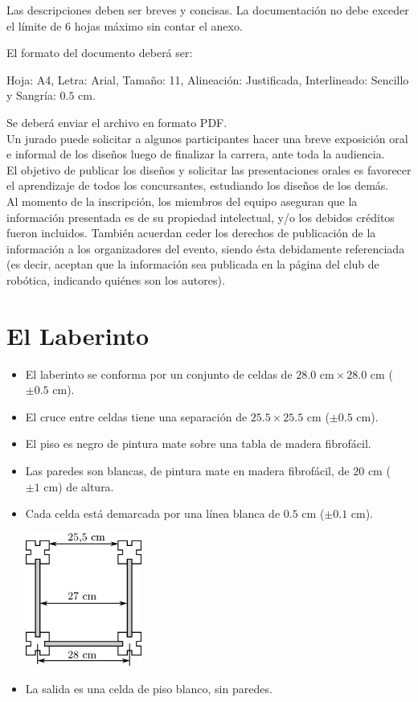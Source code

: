 \documentclass[a4paper,11pt]{article}
\newcommand{\cm}{\ensuremath{\mbox{~cm}}}
\begin{document}
Las descripciones deben ser breves y concisas. La documentación no debe exceder el límite de 6 hojas máximo sin contar el anexo. 

El formato del documento deberá ser: 

Hoja: A4, Letra: Arial, Tamaño: 11, Alineación: Justificada, Interlineado: Sencillo y Sangría: $0.5\cm$. 

Se deberá enviar el archivo en formato PDF.\\

Un jurado puede solicitar a algunos participantes hacer una breve exposición oral e informal de los diseños luego de finalizar la carrera, ante toda la audiencia.\\

El objetivo de publicar los diseños y solicitar las presentaciones orales es favorecer el aprendizaje de todos los concursantes, estudiando los diseños de los demás.\\

Al momento de la inscripción, los miembros del equipo aseguran que la información presentada es de su propiedad intelectual, y/o los debidos créditos fueron incluidos. También acuerdan ceder los derechos de publicación de la información a los organizadores del evento, siendo ésta debidamente referenciada (es decir, aceptan que la información sea publicada en la página del club de robótica, indicando quiénes son los autores).

\section*{El Laberinto}
\begin{itemize}
  \item El laberinto se conforma por un conjunto de celdas de $28.0\cm \times 28.0\cm$  ($\pm0.5\cm$).
  \item El cruce entre celdas tiene una separación de $25.5 \times 25.5\cm$ ($\pm0.5\cm$).
  \item El piso es negro de pintura mate sobre una tabla de madera fibrofácil.
  \item Las paredes son blancas, de pintura mate en madera fibrofácil, de $20\cm$ ($\pm1\cm$) de altura.
  \item Cada celda está demarcada por una línea blanca de $0.5\cm$ ($\pm0.1\cm$).
    \begin{center}
      \includegraphics[width=0.3\textwidth]{./paredes.png}
    \end{center}
  \item La salida es una celda de piso blanco, sin paredes.
\end{itemize}
\end{document}
